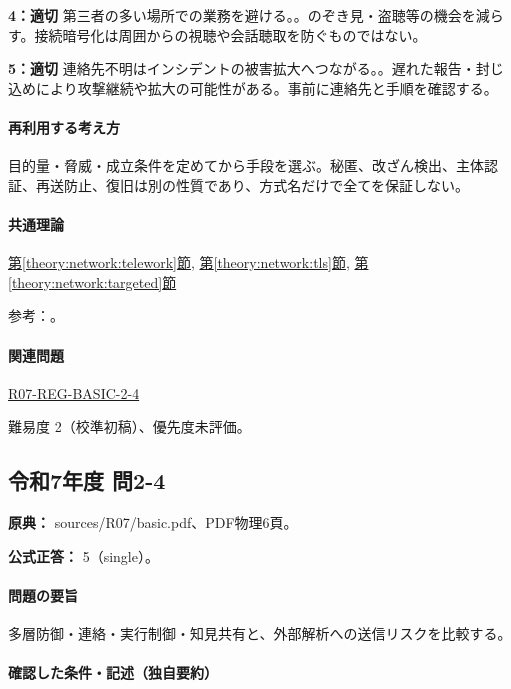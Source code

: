 \noindent\textbf{4：適切} 第三者の多い場所での業務を避ける。。のぞき見・盗聴等の機会を減らす。接続暗号化は周囲からの視聴や会話聴取を防ぐものではない。\par

\noindent\textbf{5：適切} 連絡先不明はインシデントの被害拡大へつながる。。遅れた報告・封じ込めにより攻撃継続や拡大の可能性がある。事前に連絡先と手順を確認する。\par

\paragraph{再利用する考え方} 目的量・脅威・成立条件を定めてから手段を選ぶ。秘匿、改ざん検出、主体認証、再送防止、復旧は別の性質であり、方式名だけで全てを保証しない。

\paragraph{共通理論} \hyperref[theory:network:telework]{第\ref*{theory:network:telework}節}, \hyperref[theory:network:tls]{第\ref*{theory:network:tls}節}, \hyperref[theory:network:targeted]{第\ref*{theory:network:targeted}節}

\par 参考：\cite{net_meeting2020,net_telework}。

\paragraph{関連問題} \hyperref[q:r07-reg-basic-2-4]{R07-REG-BASIC-2-4}

\par 難易度 2（校準初稿）、優先度未評価。

\subsection{令和7年度 問2-4}
\label{q:r07-reg-basic-2-4}

\noindent\textbf{原典：} sources/R07/basic.pdf、PDF物理6頁。

\textbf{公式正答：} 5（single）。

\paragraph{問題の要旨} 多層防御・連絡・実行制御・知見共有と、外部解析への送信リスクを比較する。

\paragraph{確認した条件・記述（独自要約）}\mbox{}\par

